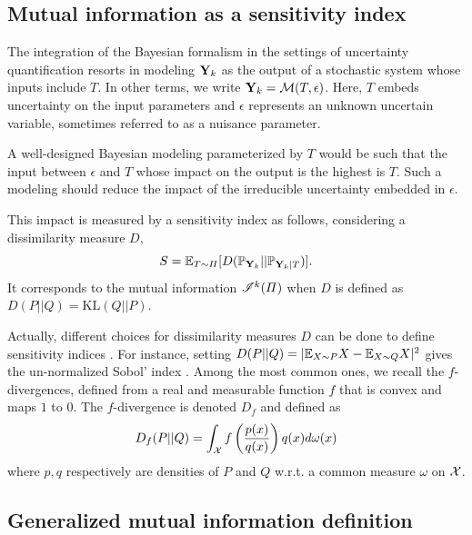 \subsection{Mutual information as a sensitivity index}

The integration of the Bayesian formalism in the settings of uncertainty quantification resorts in modeling $\mathbf{Y}_k$ as the output of a stochastic system whose inputs include $T$. In other terms, we write $\mathbf{Y}_k=\mathcal{M}(T,\epsilon)$. Here, $T$ embeds uncertainty on  the input parameters and $\epsilon$ represents an unknown uncertain variable, sometimes referred to as a nuisance parameter.

A well-designed Bayesian modeling parameterized by $T$ would be such that the input between $\epsilon$ and $T$ whose impact on the output
is the highest is $T$. Such a modeling should reduce the impact of the irreducible uncertainty embedded in $\epsilon$.

This impact is measured by a sensitivity index as follows, considering a dissimilarity measure $D$, 
    \begin{equation}
        S = \mathbb{E}_{T\sim\varPi}[ D(\mathbb{P}_{\mathbf{Y}_k}||\mathbb{P}_{\mathbf{Y}_k|T}) ].
    \end{equation}
It corresponds to the mutual information $\mathscr{I}^k(\varPi)$ when $D$ is defined as $D(P||Q)=\text{KL}(Q||P)$.

Actually, different choices for dissimilarity measures $D$ can be done to define sensitivity indices \citep{da_veiga_global_2015}. For instance, setting $D(P||Q)=|\mathbb{E}_{X\sim P}X-\mathbb{E}_{X\sim Q}X|^2$ gives the un-normalized Sobol’ index \citep{sobol_sensitivity_1993}.
Among the most common ones, we recall the $f$-divergences, defined from a real and measurable function $f$ that is convex and maps $1$ to $0$. The $f$-divergence is denoted $D_f$ and defined as 
    \begin{equation}
        D_f(P||Q) = \int_{\mathcal{X}} f\left(\frac{p(x)}{q(x)}\right) q(x) d\omega(x)
    \end{equation}
where $p,q$ respectively are densities of $P$ and $Q$  w.r.t. a common measure $\omega$ on $\mathcal{X}$.







\subsection{Generalized mutual information definition}


